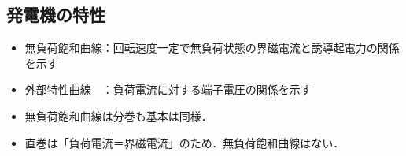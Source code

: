 \subsection{発電機の特性}
\begin{itemize}
  \item 無負荷飽和曲線：回転速度一定で無負荷状態の界磁電流と誘導起電力の関係を示す
  \item 外部特性曲線　：負荷電流に対する端子電圧の関係を示す
  \item 無負荷飽和曲線は分巻も基本は同様．
  \item 直巻は「負荷電流＝界磁電流」のため．無負荷飽和曲線はない．
\end{itemize}



